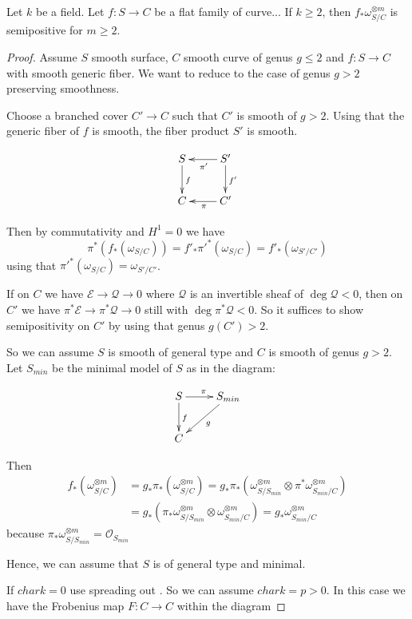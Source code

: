 \begin{lemma}
Let $k$ be a field.
Let $f : S \to C$ be a flat family of curve...
If $k \geq 2$, then $f_*\omega_{S/C}^{\otimes m}$ is semipositive for $m \geq 2$.
\end{lemma}

\begin{proof}
Assume $S$ smooth surface, $C$ smooth curve of genus $g\leq 2$ and $f:S\to C$ with smooth generic fiber. We want to  reduce to the case of genus $g>2$ preserving smoothness. 

Choose a branched cover $C'\to C$ such that $C'$ is smooth of $g>2$. Using that the generic fiber of $f$ is smooth, the fiber product $S'$ is smooth. 

$$
\xymatrix{
S \ar[d]^f  &S' \ar[d]^{f'} \ar[l]^{\pi'} \\
C   &C' \ar[l]^{\pi} 
}
$$

Then by commutativity and $H^1=0$ we have $$\pi^*(f_*(\omega_{S/C}))=f'_*\pi'^*(\omega_{S/C})=f'_*(\omega_{S'/C'})$$ using that $\pi'^*(\omega_{S/C})=\omega_{S'/C'}$. 

If on $C$ we have $\mathcal{E}\to \mathcal{Q}\to 0$ where $\mathcal{Q}$ is an invertible sheaf of $\deg \mathcal{Q}<0$, then on $C'$ we have $\pi^*\mathcal{E}\to \pi^*\mathcal{Q}\to 0$ still with $\deg \pi^*\mathcal{Q}<0$. So it suffices to show semipositivity on $C'$ by using that genus $g(C')>2$.

So we can assume $S$ is smooth of general type and $C$ is smooth of genus $g>2$. Let $S_{min}$ be the minimal model of $S$ as in the diagram:

$$
\xymatrix{
S \ar[d]^f \ar[r]^{\pi} &S_{min} \ar[ld]^g\\
C 
}
$$

Then 
\begin{align*}
f_*(\omega^{\otimes m}_{S/C}) & =g_*\pi_*(\omega^{\otimes m}_{S/C})=g_*\pi_*(\omega^{\otimes m}_{S/S_{min}}\otimes \pi^*\omega^{\otimes m}_{S_{min}/C})\\ & =g_*(\pi_*\omega^{\otimes m}_{S/S_{min}}\otimes \omega^{\otimes m}_{S_{min}/C})=g_*\omega^{\otimes m}_{S_{min}/C} 
\end{align*}
because $\pi_*\omega^{\otimes m}_{S/S_{min}}=\mathcal{O}_{S_{min}}$  

Hence, we can assume that $S$ is of general type and minimal.

If $char k=0$ use spreading out . So we can assume $char k=p>0$. In this case we have the Frobenius map $F:C\to C$ within the diagram 


\end{proof}
